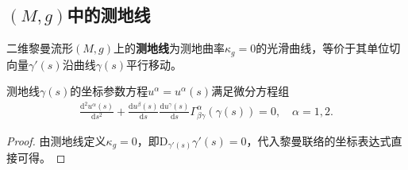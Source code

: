 \documentclass[../../main.tex]{subfiles}%
\begin{document}
\subsection{$(M,g)$中的测地线}

\begin{definition}
二维黎曼流形$(M,g)$上的\textbf{测地线}为测地曲率$\kappa_g=0$的光滑曲线，等价于其单位切向量$\gamma'(s)$沿曲线$\gamma(s)$平行移动。
\end{definition}

\begin{proposition}
测地线$\gamma(s)$的坐标参数方程$u^\alpha=u^\alpha(s)$满足微分方程组
\begin{align}
\frac{\mathrm{d}^2u^\alpha(s)}{\mathrm{d}s^2}+\frac{\mathrm{d}u^\beta(s)}{\mathrm{d}s}\frac{\mathrm{d}u^\gamma(s)}{\mathrm{d}s}\Gamma^\alpha_{\beta\gamma}(\gamma(s))=0,\quad \alpha=1,2.\label{eq:geo_eq}
\end{align}
\end{proposition}
\begin{proof}

由测地线定义$\kappa_g=0$，即$\mathrm{D}_{\gamma'(s)}\gamma'(s)=0$，代入黎曼联络的坐标表达式直接可得。

\end{proof}
\end{document}
